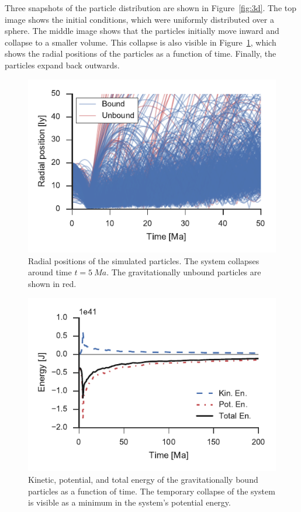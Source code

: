 \documentclass[aps,prc,reprint,floatfix,nobalancelastpage]{revtex4-1}
\begin{document}
    Three snapshots of the particle distribution are shown in Figure~\ref{fig:3d}. The top image shows the initial conditions, which were uniformly distributed over a sphere. The middle image shows that the particles initially move inward and collapse to a smaller volume. This collapse is also visible in Figure~\ref{fig:rads}, which shows the radial positions of the particles as a function of time. Finally, the particles expand back outwards.

    \begin{figure}[p]
        \centering
        \includegraphics{rads.pdf}
        \caption{Radial positions of the simulated particles. The system collapses around time $t=\SI{5}{Ma}$. The gravitationally unbound particles are shown in red.}
        \label{fig:rads}
    \end{figure}

    \begin{figure}[p]
        \centering
        \includegraphics{boundEnergy.pdf}
        \caption{Kinetic, potential, and total energy of the gravitationally bound particles as a function of time. The temporary collapse of the system is visible as a minimum in the system's potential energy.}
        \label{fig:boundEnergy}
    \end{figure}
\end{document}
